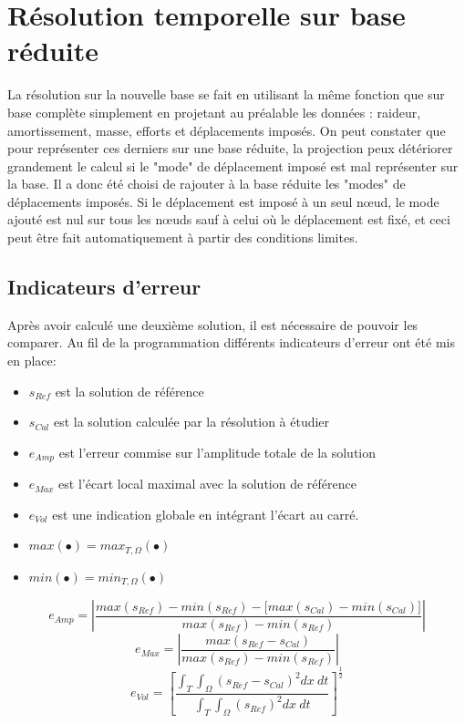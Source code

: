 \documentclass[12pt,a4paper]{report}
\begin{document}
\section{Résolution temporelle sur base réduite}
La résolution sur la nouvelle base se fait en utilisant la même fonction que sur base complète simplement en projetant au préalable les données : raideur, amortissement, masse, efforts et déplacements imposés. On peut constater que pour représenter ces derniers sur une base réduite, la projection peux détériorer grandement le calcul si le "mode" de déplacement imposé est mal représenter sur la base. Il a donc été choisi de rajouter à la base réduite les "modes" de déplacements imposés. Si le déplacement est imposé à un seul nœud, le mode ajouté  est nul sur tous les nœuds sauf à celui où le déplacement est fixé, et ceci peut être fait automatiquement à partir des conditions limites.

\subsection{Indicateurs d'erreur}
Après avoir calculé une deuxième solution, il est nécessaire de pouvoir les comparer. Au fil de la programmation différents indicateurs d'erreur ont été mis en place:

\label{EquationErreurPartie}
\begin{itemize}
\item $s_ {Ref}$ est la solution de référence
\item $s_ {Cal}$ est la solution calculée par la résolution à étudier
\item $e_ {Amp}$ est l'erreur commise sur l'amplitude totale de la solution
\item $e_ {Max}$ est l'écart local maximal avec la solution de référence
\item $e_ {Vol}$ est une indication globale en intégrant l'écart au carré.
\item $max(\bullet) = max_{T,\Omega}(\bullet)$
\item $min(\bullet) = min_{T,\Omega}(\bullet)$
\end{itemize}
\begin{equation}
\label{EquationErreurAmp}
e_ {Amp} = \left|\frac{max(s_ {Ref}) - min(s_ {Ref}) 
					- \big[ max(s_ {Cal}) - min(s_ {Cal}) \big] }
{max(s_ {Ref}) - min(s_ {Ref})} \right|
\end{equation}
\begin{equation}
\label{EquationErreurMax}
e_ {Max} = \left|\frac{ max(s_ {Ref} - s_ {Cal}) }
{max(s_ {Ref}) - min(s_ {Ref})} \right|
\end{equation}
\begin{equation}
\label{EquationErreurVol}
e_ {Vol} = \left[ 
\frac{ \displaystyle \int_{T} \! \int_\Omega 
	(s_ {Ref} - s_ {Cal} )^2 dx~dt }
{ \displaystyle \int_{T} \! \int_\Omega 
	(s_ {Ref} )^2 dx~dt }
\right]^\frac{1}{2}
\end{equation}
\end{document}
